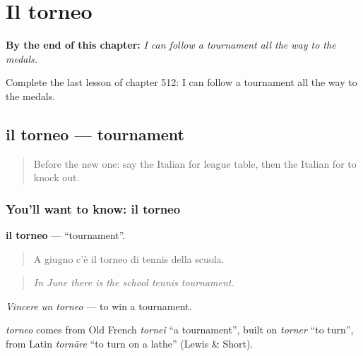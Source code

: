 
\chapter{Il torneo}
\label{ch:it-il-torneo}

\begin{chapteropening}
\textbf{By the end of this chapter:} \emph{I can follow a tournament all the way to the medals.}

Complete the last lesson of chapter 512: I can follow a tournament all the way to the medals.
\end{chapteropening}

\section[il torneo]{il torneo — tournament}

\label{lesson:IT-C512-torneo}



\begin{quote}
Before the new one: say the Italian for league table, then the Italian for to knock out.
\end{quote}

\subsection*{You'll want to know: il torneo}
\textbf{il torneo} — \textquotedblleft{}tournament\textquotedblright{}.

\begin{quote}
A giugno c'è il torneo di tennis della scuola.
\end{quote}

\begin{quote}
\emph{In June there is the school tennis tournament.}
\end{quote}

\emph{Vincere un torneo} — to win a tournament.

\begin{cousinweb}
\emph{torneo} comes from Old French \emph{tornei} \textquotedblleft{}a tournament\textquotedblright{}, built on \emph{torner} \textquotedblleft{}to turn\textquotedblright{}, from Latin \emph{tornāre} \textquotedblleft{}to turn on a lathe\textquotedblright{} (Lewis \& Short).
\end{cousinweb}

